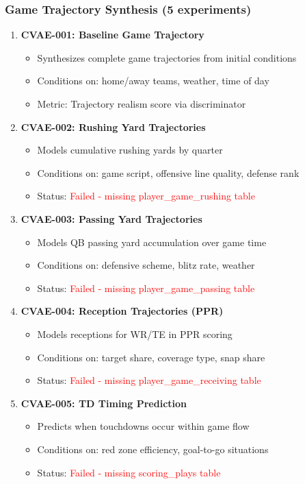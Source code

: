 \subsubsection{Game Trajectory Synthesis (5 experiments)}
\begin{enumerate}
    \item \textbf{CVAE-001: Baseline Game Trajectory}
    \begin{itemize}
        \item Synthesizes complete game trajectories from initial conditions
        \item Conditions on: home/away teams, weather, time of day
        \item Metric: Trajectory realism score via discriminator
    \end{itemize}

    \item \textbf{CVAE-002: Rushing Yard Trajectories}
    \begin{itemize}
        \item Models cumulative rushing yards by quarter
        \item Conditions on: game script, offensive line quality, defense rank
        \item Status: \textcolor{red}{Failed - missing player\_game\_rushing table}
    \end{itemize}

    \item \textbf{CVAE-003: Passing Yard Trajectories}
    \begin{itemize}
        \item Models QB passing yard accumulation over game time
        \item Conditions on: defensive scheme, blitz rate, weather
        \item Status: \textcolor{red}{Failed - missing player\_game\_passing table}
    \end{itemize}

    \item \textbf{CVAE-004: Reception Trajectories (PPR)}
    \begin{itemize}
        \item Models receptions for WR/TE in PPR scoring
        \item Conditions on: target share, coverage type, snap share
        \item Status: \textcolor{red}{Failed - missing player\_game\_receiving table}
    \end{itemize}

    \item \textbf{CVAE-005: TD Timing Prediction}
    \begin{itemize}
        \item Predicts when touchdowns occur within game flow
        \item Conditions on: red zone efficiency, goal-to-go situations
        \item Status: \textcolor{red}{Failed - missing scoring\_plays table}
    \end{itemize}
\end{enumerate}

